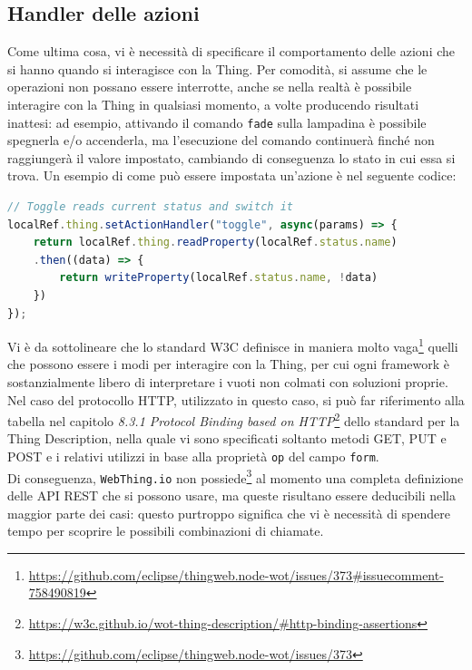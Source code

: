 \documentclass[12pt,a4paper,openright,oneside]{report}
\begin{document}
\subsection{Handler delle azioni}
Come ultima cosa, vi è necessità di specificare il comportamento delle azioni che si hanno quando si interagisce con la Thing. Per comodità, si assume che le operazioni non possano essere interrotte, anche se nella realtà è possibile interagire con la Thing in qualsiasi momento, a volte producendo risultati inattesi: ad esempio, attivando il comando \texttt{fade} sulla lampadina è possibile spegnerla e/o accenderla, ma l'esecuzione del comando continuerà finché non raggiungerà il valore impostato, cambiando di conseguenza lo stato in cui essa si trova. Un esempio di come può essere impostata un'azione è nel seguente codice:

\begin{lstlisting}[language=JavaScript,caption={Reagire all'invocazione dell'azione in \texttt{bulb.js}}]
// Toggle reads current status and switch it
localRef.thing.setActionHandler("toggle", async(params) => {
	return localRef.thing.readProperty(localRef.status.name)
	.then((data) => {
		return writeProperty(localRef.status.name, !data)
	})
});
\end{lstlisting}


Vi è da sottolineare che lo standard W3C definisce in maniera molto vaga\footnote{\url{https://github.com/eclipse/thingweb.node-wot/issues/373\#issuecomment-758490819}} quelli che possono essere i modi per interagire con la Thing, per cui ogni framework è sostanzialmente libero di interpretare i vuoti non colmati con soluzioni proprie. Nel caso del protocollo HTTP, utilizzato in questo caso, si può far riferimento alla tabella nel capitolo \textit{8.3.1 Protocol Binding based on HTTP}\footnote{\url{https://w3c.github.io/wot-thing-description/\#http-binding-assertions}} dello standard per la Thing Description, nella quale vi sono specificati soltanto metodi GET, PUT e POST e i relativi utilizzi in base alla proprietà \texttt{op} del campo \texttt{form}.\\

Di conseguenza, \texttt{WebThing.io} non possiede\footnote{\url{https://github.com/eclipse/thingweb.node-wot/issues/373}} al momento una completa definizione delle API REST che si possono usare, ma queste risultano essere deducibili nella maggior parte dei casi: questo purtroppo significa che vi è necessità di spendere tempo per scoprire le possibili combinazioni di chiamate.\\
\end{document}
